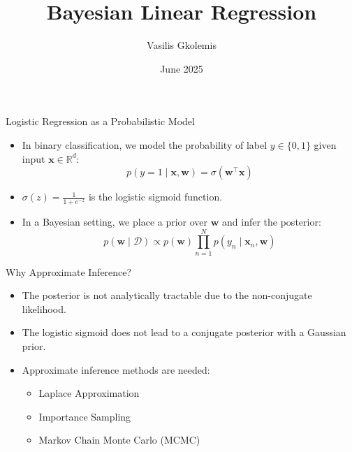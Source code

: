 \documentclass{beamer}
\title{Bayesian Linear Regression}
\author{Vasilis Gkolemis}
\institute{ATHENA RC | HUA}
\date{June 2025}
\begin{document}
\frame{\titlepage}


\begin{frame}{Logistic Regression as a Probabilistic Model}
\begin{itemize}
  \item In binary classification, we model the probability of label $y \in \{0,1\}$ given input $\mathbf{x} \in \mathbb{R}^d$:
  \[
    p(y = 1 \mid \mathbf{x}, \mathbf{w}) = \sigma(\mathbf{w}^\top \mathbf{x})
  \]
  \item $\sigma(z) = \frac{1}{1 + e^{-z}}$ is the logistic sigmoid function.
  \item In a Bayesian setting, we place a prior over $\mathbf{w}$ and infer the posterior:
  \[
    p(\mathbf{w} \mid \mathcal{D}) \propto p(\mathbf{w}) \prod_{n=1}^{N} p(y_n \mid \mathbf{x}_n, \mathbf{w})
  \]
\end{itemize}
\end{frame}

\begin{frame}{Why Approximate Inference?}
\begin{itemize}
  \item The posterior is not analytically tractable due to the non-conjugate likelihood.
  \item The logistic sigmoid does not lead to a conjugate posterior with a Gaussian prior.
  \item Approximate inference methods are needed:
  \begin{itemize}
    \item Laplace Approximation
    \item Importance Sampling
    \item Markov Chain Monte Carlo (MCMC)
  \end{itemize}
\end{itemize}
\end{frame}
\end{document}
